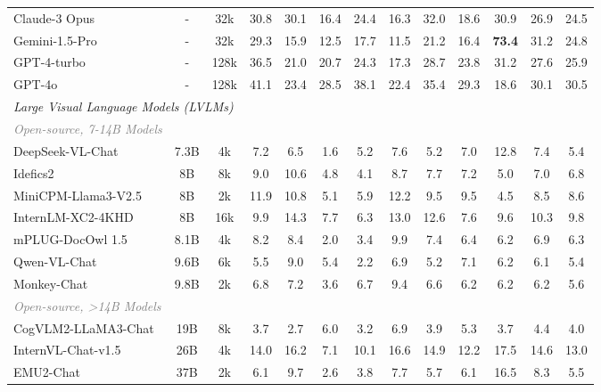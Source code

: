 \begin{table}[!htbp]
{\begin{tabular}{l cc|ccccc|ccc|cc}
    Claude-3 Opus~\cite{claude3} & - & 32k & 30.8 & \colorbox{secondBest}{30.1} & 16.4 & 24.4 & 16.3 & 32.0 & 18.6 & 30.9 & 26.9 & 24.5 \\
    Gemini-1.5-Pro~\cite{geminiteam2024gemini} & - & 32k & 29.3 & 15.9 & 12.5 & 17.7 & 11.5 & 21.2 & 16.4 & \colorbox{firstBest}{\textbf{73.4}} & 31.2 & 24.8 \\
    GPT-4-turbo~\cite{openai2024gpt4} & - & 128k & 36.5 & 21.0 & 20.7 & 24.3 & 17.3 & 28.7 & 23.8 &  31.2 & 27.6 & 25.9 \\
    GPT-4o~\cite{gpt4o} & - & 128k & \colorbox{secondBest}{41.1} & 23.4 & \colorbox{secondBest}{28.5} & \colorbox{secondBest}{38.1} & 22.4 & 35.4 & \colorbox{secondBest}{29.3} & 18.6 & 30.1 & 30.5 \\
    \midrule
    \multicolumn{13}{l}{\hfill \textit{Large Visual Language Models (LVLMs)}} \\
    \midrule
    \textcolor{gray}{\textit{Open-source, 7-14B Models}} \\
    DeepSeek-VL-Chat~\cite{lu2024deepseek} & 7.3B & 4k & 7.2 & 6.5 & 1.6 & 5.2 & 7.6 & 5.2 & 7.0 & 12.8 & 7.4 & 5.4 \\
    Idefics2~\cite{laurençon2024matters} & 8B & 8k & 9.0 & 10.6 & 4.8 & 4.1 & 8.7 & 7.7 & 7.2 & 5.0 & 7.0 & 6.8 \\
    MiniCPM-Llama3-V2.5~\cite{yu2024rlaifv,xu2024llava-uhd} & 8B & 2k & 11.9 & 10.8 & 5.1 & 5.9 & 12.2 & 9.5 & 9.5 & 4.5 & 8.5 & 8.6 \\
    InternLM-XC2-4KHD~\cite{dong2024internlm} & 8B & 16k & 9.9 & 14.3 & 7.7 & 6.3 & 13.0 & 12.6 & 7.6 & 9.6 & 10.3 & 9.8 \\
    mPLUG-DocOwl 1.5~\cite{hu2024mplug} & 8.1B & 4k & 8.2 & 8.4 & 2.0 & 3.4 & 9.9 & 7.4 & 6.4 & 6.2 & 6.9 & 6.3 \\
    Qwen-VL-Chat~\cite{bai2023qwenvl} & 9.6B & 6k & 5.5 & 9.0 & 5.4 & 2.2 & 6.9 & 5.2 & 7.1 & 6.2 & 6.1 & 5.4 \\
    Monkey-Chat~\cite{li2023monkey} & 9.8B & 2k & 6.8 & 7.2 & 3.6 & 6.7 & 9.4 & 6.6 & 6.2 & 6.2 & 6.2 & 5.6 \\
    \textcolor{gray}{\textit{Open-source, >14B Models}} \\
    CogVLM2-LLaMA3-Chat~\cite{wang2023cogvlm} & 19B & 8k & 3.7 & 2.7 & 6.0 & 3.2 & 6.9 & 3.9 & 5.3 & 3.7 & 4.4 & 4.0 \\
    InternVL-Chat-v1.5~\cite{chen2024far} & 26B & 4k & 14.0 & 16.2 & 7.1 & 10.1 & 16.6 & 14.9 & 12.2 & 17.5 & 14.6 & 13.0 \\
    EMU2-Chat~\cite{sun2023generative} & 37B & 2k & 6.1 & 9.7 & 2.6 & 3.8 & 7.7 & 5.7 & 6.1 & 16.5 & 8.3 & 5.5 \\

\end{tabular}}
\end{table}
